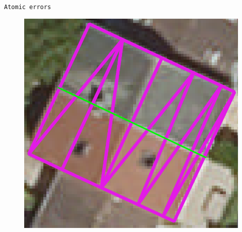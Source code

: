 \documentclass[10pt]{beamer}
\begin{document}
\begin{frame}{\texttt{Atomic errors}}
\begin{overlayarea}{\textwidth}{.5\textheight}
{\begin{figure}[H]
{{                                }{
                                    \includegraphics[height=.4\textheight]{images/errors/building/under_segmentation}
                                }
                            }{
                                }
\end{figure}}
\end{overlayarea}
\end{frame}
\end{document}
